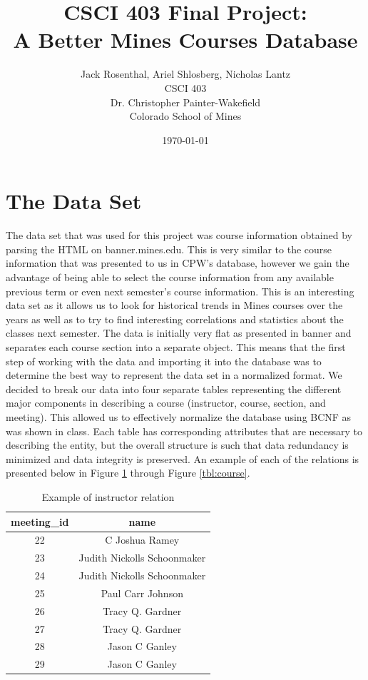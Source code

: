 \documentclass[12pt,letterpaper,titlepage]{article}
\title{CSCI 403 Final Project:\\
       A Better Mines Courses Database}
\date{\today}
\author{Jack Rosenthal, Ariel Shlosberg, Nicholas Lantz\\
        \small CSCI 403\\
        \small Dr. Christopher Painter-Wakefield\\
        \small Colorado School of Mines}
\begin{document}
\maketitle

\section{The Data Set}
The data set that was used for this project was course information obtained by parsing the HTML on banner.mines.edu. This is very similar to the course information that was presented to us in CPW's database, however we gain the advantage of being able to select the course information from any available previous term or even next semester's course information. This is an interesting data set as it allows us to look for historical trends in Mines courses over the years as well as to try to find interesting correlations and statistics about the classes next semester. The data is initially very flat as presented in banner and separates each course section into a separate object. This means that the first step of working with the data and importing it into the database was to determine the best way to represent the data set in a normalized format. We decided to break our data into four separate tables representing the different major components in describing a course (instructor, course, section, and meeting). This allowed us to effectively normalize the database using BCNF as was shown in class. Each table has corresponding attributes that are necessary to describing the entity, but the overall structure is such that data redundancy is minimized and data integrity is preserved. An example of each of the relations is presented below in Figure \ref{tbl:instructor} through Figure \ref{tbl:course}.

\begin{table}[H]
\centering
\begin{tabular}{|c|c|}
\hline
meeting\_id & name \\ \hline
22 & C Joshua Ramey \\ \hline
23 & Judith Nickolls Schoonmaker \\ \hline
24 & Judith Nickolls Schoonmaker \\ \hline
25 & Paul Carr Johnson \\ \hline
26 & Tracy Q. Gardner \\ \hline
27 & Tracy Q. Gardner \\ \hline
28 & Jason C Ganley \\ \hline
29 & Jason C Ganley \\ \hline
\end{tabular}
\caption{\label{tbl:instructor} Example of instructor relation}
\end{table}
\end{document}
